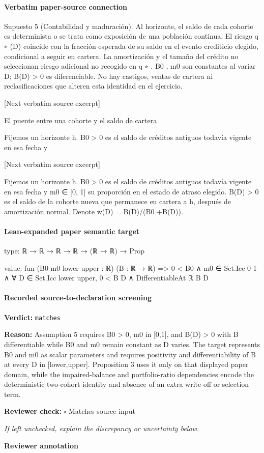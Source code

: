 \documentclass[10pt]{article}
\newcommand{\reviewerbox}{%
  \par\noindent\fbox{\parbox{0.96\linewidth}{\rule{0pt}{0.38in}}}\par
}
\newcommand{\reviewmatch}[1]{%
  \par\noindent\textbf{Reviewer check:} $\square$\; #1\par
  \noindent\emph{If left unchecked, explain the discrepancy or uncertainty below.}\par
}
\begin{document}
\paragraph{Verbatim paper-source connection}
\begin{ReviewVerbatim}
Supuesto 5 (Contabilidad y maduración). Al horizonte, el saldo de cada cohorte es determinista
o se trata como exposición de una población continua. El riesgo q ∗ (D) coincide con la fracción
esperada de su saldo en el evento crediticio elegido, condicional a seguir en cartera. La amortización
y el tamaño del crédito no seleccionan riesgo adicional no recogido en q ∗ . B0 , m0 son constantes
al variar D; B(D) > 0 es diferenciable. No hay castigos, ventas de cartera ni reclasiﬁcaciones que
alteren esta identidad en el ejercicio.

[Next verbatim source excerpt]

El puente entre una cohorte y el saldo de cartera

Fijemos un horizonte h. B0 > 0 es el saldo de créditos antiguos todavía vigente en esa fecha y

[Next verbatim source excerpt]

Fijemos un horizonte h. B0 > 0 es el saldo de créditos antiguos todavía vigente en esa fecha y
m0 ∈ [0, 1] su proporción en el estado de atraso elegido. B(D) > 0 es el saldo de la cohorte nueva
que permanece en cartera a h, después de amortización normal. Denote w(D) = B(D)/(B0 +B(D)).
\end{ReviewVerbatim}



\paragraph{Lean-expanded paper semantic target}
\begin{ReviewVerbatim}
type:
ℝ → ℝ → ℝ → ℝ → (ℝ → ℝ) → Prop

value:
fun (B0 m0 lower upper : ℝ) (B : ℝ → ℝ) =>
  0 < B0 ∧ m0 ∈ Set.Icc 0 1 ∧ ∀ D ∈ Set.Icc lower upper, 0 < B D ∧ DifferentiableAt ℝ B D
\end{ReviewVerbatim}


\paragraph{Recorded source-to-declaration screening}
\textbf{Verdict:} \texttt{matches}
\\
{\raggedright
\textbf{Reason:} Assumption 5 requires B0 > 0, m0 in [0,1], and B(D) > 0 with B differentiable while B0 and m0 remain constant as D varies.\allowbreak{} The target represents B0 and m0 as scalar parameters and requires positivity and differentiability of B at every D in [lower,upper].\allowbreak{} Proposition 3 uses it only on that displayed paper domain, while the impaired-\allowbreak{}balance and portfolio-\allowbreak{}ratio dependencies encode the deterministic two-\allowbreak{}cohort identity and absence of an extra write-\allowbreak{}off or selection term.\allowbreak{}
\par}
\reviewmatch{Matches source input}
\noindent\textbf{Reviewer annotation}\par
\reviewerbox
\clearpage
\hypertarget{paper-prerequisite-e5f9b7ce782f743a}{}
\end{document}
